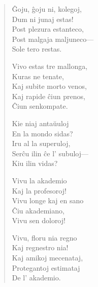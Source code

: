 \documentclass[ngerman,12pt,twoside]{book}
\begin{document}
{\centering{}\par}

\begin{verse}

\begin{patverse} \vin \vin 
Ĝoju, ĝoju ni, kolegoj,\\
Dum ni junaj estas!\\
Post plezura estanteco,\\
Post malgaja maljuneco---\\
Sole tero restas.
\end{patverse}

\pstars

\begin{patverse} \vin \vin 
Vivo estas tre mallonga,\\
Kuras ne tenate,\\
Kaj subite morto venos,\\
Kaj rapide ĉiun prenos,\\
Ĉiun senkompate.
\end{patverse}

\pstars

\newpage
\begin{patverse} \vin \vin
Kie niaj antaŭuloj\\
En la mondo sidas?\\
Iru al la superuloj,\\
Serĉu ilin ĉe l' subuloj---\\
Kiu ilin vidas?
\end{patverse}

\pstars

\begin{patverse} \vin \vin
Vivu la akademio\\
Kaj la profesoroj!\\
Vivu longe kaj en sano\\
Ĉiu akademiano,\\
Vivu sen doloroj!
\end{patverse}

\pstars

\begin{patverse} \vin \vin
Vivu, floru nia regno\\
Kaj regnestro nia!\\
Kaj amikoj mecenataj,\\
Protegantoj estimataj\\
De l' akademio.
\end{patverse}


\end{verse}
\end{document}
